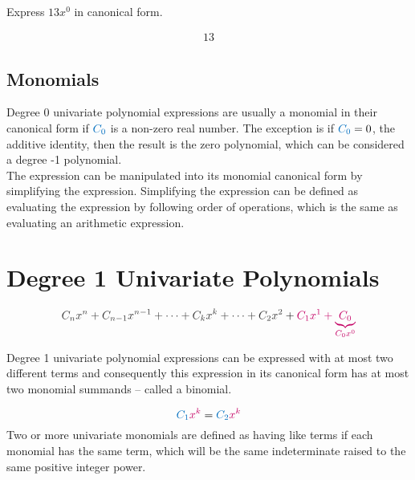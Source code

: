 \begin{example}[id:20141121-093747] \label{20141121-093747} \hfill \\

Express $13x^0$ in canonical form.

\soln

\solnsteps
\begin{align*}
13 %
\end{align*}
\end{example}  

\subsection*{Monomials}

Degree 0 univariate polynomial expressions are usually a monomial in their canonical form if $\cBlue{C_{0}}$ is a non-zero real number.  The exception is if $\cBlue{C_{0}}=0$, the additive identity, then the result is the zero polynomial, which can be considered a degree -1 polynomial.\\   

The expression can be manipulated into its monomial canonical form by simplifying the expression.  Simplifying the expression can be defined as evaluating the expression by following order of operations, which is the same as evaluating an arithmetic expression.  


\section{Degree 1 Univariate Polynomials}

\[
\cDarkGrey{C_{n}x^{n}+C_{n-1}x^{n-1}+ \cdots + C_{k}x^{k} + \cdots + C_{2}x^{2}}+\cRed{C_{1}x^{1}+\underbrace{C_{0}}_{C_{0}x^{0}}} 
\]

Degree 1 univariate polynomial expressions can be expressed with at most two different terms and consequently this expression in its canonical form has at most two monomial summands -- called a binomial.

\begin{definition}

\[
\cBlue{C_{1}}\cRed{x^{k}} = \cBlue{C_{2}}\cRed{x^{k}} 
\]
Two or more univariate monomials are defined as having like terms if each monomial has the same term, which will be the same indeterminate raised to the same positive integer power.
\end{definition}


